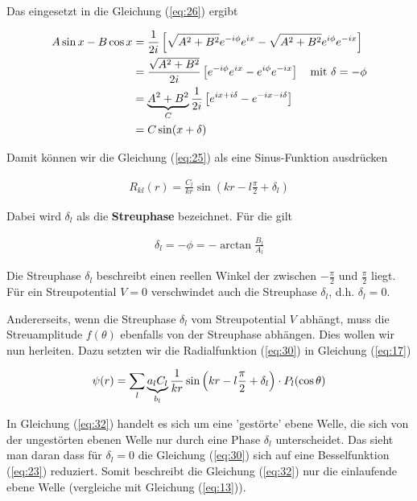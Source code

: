 Das eingesetzt in die Gleichung (\ref{eq:26}) ergibt

\begin{align}
  \label{eq:29}
   A\sin x - B\cos x &= \frac{1}{2i} \left[ \sqrt{A^2+B^2}e^{-i\phi}e^{ix}- \sqrt{A^2+B^2}e^{i\phi} e^{-ix}\right]\notag\\
&=\frac{\sqrt{A^2+B^2}}{2i} \left[ e^{-i\phi}e^{ix}- e^{i\phi} e^{-ix}\right] \quad\text{mit }\delta = -\phi\notag\\
&=\underbr{A^2+B^2}_{C}\frac{1}{2i} \left[ e^{ix+i\delta}- e^{-ix-i\delta}\right] \notag\\
&=C \sin(x+\delta)
\end{align}

Damit können wir die Gleichung (\ref{eq:25}) als eine Sinus-Funktion ausdrücken

\begin{align}
  \label{eq:30}
  R_{kl}(r) = \frac{C_l}{kr}  \sin\left(kr-l\frac{\pi}{2} + \delta_l\right)
\end{align}

Dabei wird \(\delta_l\) als die \textbf{Streuphase} bezeichnet. Für die gilt

\begin{align}
  \label{eq:31}
  \delta_l = - \phi = - \arctan \frac{B_l}{A_l}
\end{align}

Die Streuphase \(\delta_l\) beschreibt einen reellen Winkel der zwischen \(-\frac{\pi}{2}\) und \(\frac{\pi}{2}\) liegt. Für ein Streupotential \(V=0\) verschwindet auch die Streuphase \(\delta_l\), d.h. \(\delta_l=0\).

Andererseits, wenn die Streuphase \(\delta_l\) vom Streupotential \(V\) abhängt, muss die Streuamplitude \(f(\theta)\) ebenfalls von der Streuphase abhängen. Dies wollen wir nun herleiten. Dazu setzten wir die Radialfunktion (\ref{eq:30}) in Gleichung (\ref{eq:17})

\begin{align}
  \label{eq:32}
  \psi(r) = \sum_l \underbr{a_{l}C_l}_{b_l} \frac{1}{kr}  \sin\left(kr-l\frac{\pi}{2} + \delta_l\right)  \cdot P_{l}(\cos\theta)
\end{align}

In Gleichung (\ref{eq:32}) handelt es sich um eine 'gestörte' ebene Welle, die sich von der ungestörten ebenen Welle nur durch eine Phase \(\delta_l\) unterscheidet. Das sieht man daran dass für \(\delta_l=0\) die Gleichung (\ref{eq:30}) sich auf eine Besselfunktion (\ref{eq:23})  reduziert. Somit beschreibt die Gleichung (\ref{eq:32}) nur die einlaufende ebene Welle (vergleiche mit Gleichung (\ref{eq:13})).

